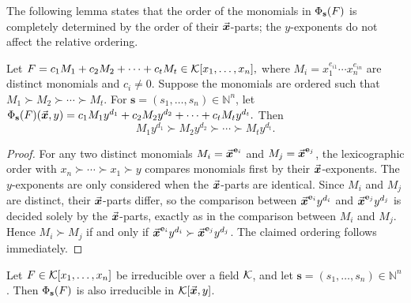 \documentclass{article}
\numberwithin{equation}{section}
\begin{document}
The following lemma states that the order of the monomials in $\Phi_{\mathbf{s}}(F)$ is completely determined by the order of their $\vec{\boldsymbol{x}}$-parts; the $y$-exponents do not affect the relative ordering.
\begin{lemma}\label{thm:order-preservation}
Let
%
$F = c_1 M_1 + c_2 M_2 + \cdots + c_t M_t \in {\mathcal{K}}[x_1, \dots, x_n],$
%
where $M_i = x_1^{e_{i1}} \cdots x_n^{e_{in}}$ are distinct monomials and $c_i \neq 0$. Suppose the monomials are ordered such that
%
$M_1 \succ M_2 \succ \cdots \succ M_t.$
%
For $\mathbf{s} = (s_1, \dots, s_n) \in \mathbb{N}^n$, let
%
$\Phi_{\mathbf{s}}(F)(\vec{\boldsymbol{x}}, y) = c_1 M_1 y^{d_1} + c_2 M_2 y^{d_2} + \cdots + c_t M_t y^{d_t}.$
%
%
Then
\[
M_1 y^{d_1} \succ M_2 y^{d_2} \succ \cdots \succ M_t y^{d_t}.
\]

\end{lemma}

\begin{proof}
For any two distinct monomials $M_i = \vec{\boldsymbol{x}}^{\mathbf{e}_i}$ and $M_j = \vec{\boldsymbol{x}}^{\mathbf{e}_j}$, the lexicographic order with $x_n \succ \cdots \succ x_1 \succ y$ compares monomials first by their $\vec{\boldsymbol{x}}$-exponents. The $y$-exponents are only considered when the $\vec{\boldsymbol{x}}$-parts are identical. Since $M_i$ and $M_j$ are distinct, their $\vec{\boldsymbol{x}}$-parts differ, so the comparison between $\vec{\boldsymbol{x}}^{\mathbf{e}_i} y^{d_i}$ and $\vec{\boldsymbol{x}}^{\mathbf{e}_j} y^{d_j}$ is decided solely by the $\vec{\boldsymbol{x}}$-parts, exactly as in the comparison between $M_i$ and $M_j$. Hence $M_i \succ M_j$ if and only if $\vec{\boldsymbol{x}}^{\mathbf{e}_i} y^{d_i} \succ \vec{\boldsymbol{x}}^{\mathbf{e}_j} y^{d_j}$. The claimed ordering follows immediately.
\end{proof}



\begin{lemma}\label{lem:irreducible-separation}
Let $F \in {\mathcal{K}}[x_1,\dots,x_n]$ be irreducible over a field ${\mathcal{K}}$, and let 
$\mathbf{s}=(s_1,\dots,s_n)\in \mathbb{N}^n$. 
Then $\Phi_{\mathbf{s}}(F)$ is also irreducible in ${\mathcal{K}}[\vec{\boldsymbol{x}}, y]$.
\end{lemma}
\end{document}
